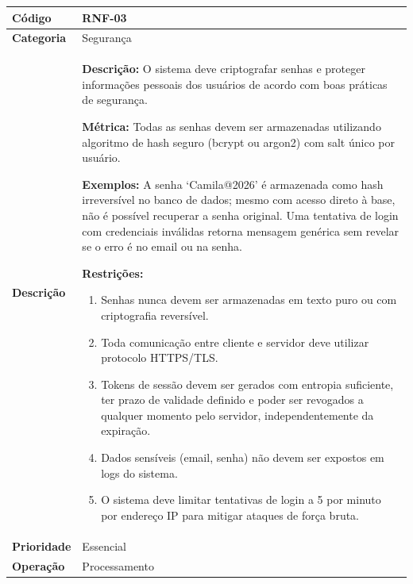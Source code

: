 \FloatBarrier
\begin{quadro}[h!]
\caption{RNF-03 -- Segurança de Senhas e Dados Pessoais}
\label{quad:rnf03}
\begin{tabular}{|p{3.2cm}|p{11.8cm}|}
\hline
\textbf{Código}     & RNF-03 \\ \hline
\textbf{Categoria}  & Segurança \\ \hline
\textbf{Descrição}  &
\textbf{Descrição:} O sistema deve criptografar senhas e proteger informações pessoais dos usuários de acordo com boas práticas de segurança.

\textbf{Métrica:} Todas as senhas devem ser armazenadas utilizando algoritmo de hash seguro (bcrypt ou argon2) com salt único por usuário.

\textbf{Exemplos:} A senha `Camila@2026' é armazenada como hash irreversível no banco de dados; mesmo com acesso direto à base, não é possível recuperar a senha original.
Uma tentativa de login com credenciais inválidas retorna mensagem genérica sem revelar se o erro é no email ou na senha.

\textbf{Restrições:}
\begin{enumerate}[nosep,leftmargin=1.2em,topsep=2pt,partopsep=0pt,parsep=0pt,itemsep=1pt]
  \item Senhas nunca devem ser armazenadas em texto puro ou com criptografia reversível.
  \item Toda comunicação entre cliente e servidor deve utilizar protocolo HTTPS/TLS.
  \item Tokens de sessão devem ser gerados com entropia suficiente, ter prazo de validade definido e poder ser revogados a qualquer momento pelo servidor, independentemente da expiração.
  \item Dados sensíveis (email, senha) não devem ser expostos em logs do sistema.
  \item O sistema deve limitar tentativas de login a 5 por minuto por endereço IP para mitigar ataques de força bruta.
\end{enumerate} \\ \hline
\textbf{Prioridade} & Essencial \\ \hline
\textbf{Operação}   & Processamento \\ \hline
\end{tabular}
\end{quadro}


